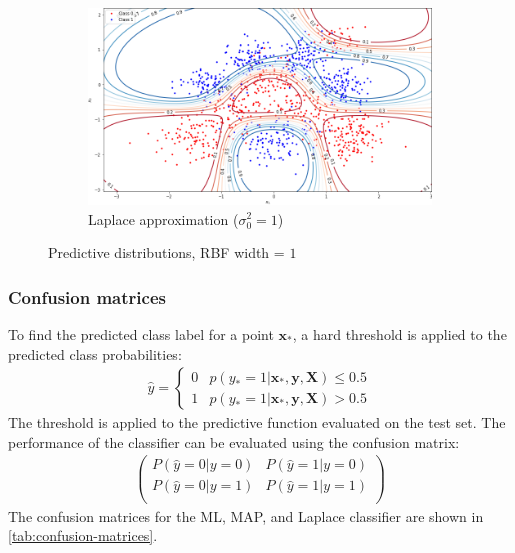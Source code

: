 \documentclass[a4paper]{article}
\begin{document}
\begin{figure}[h]
\begin{subfigure}{0.33\textwidth}
        \end{subfigure}
        \begin{subfigure}{0.33\textwidth}
            \centering
            \includegraphics[width=\textwidth]{plots/bayesian_logistic_classification/predictive_distribution_laplace_width_1_prior_variance_1}
            \caption{Laplace approximation ($\sigma_0^2=1$)}
            \label{fig:predictive-distribution-laplace-width-1}
        \end{subfigure}
        \caption{Predictive distributions, RBF width = $1$}
        \label{fig:predictive-distributions-width-1}
    \end{figure}

    \subsubsection{Confusion matrices}
    To find the predicted class label for a point $\bm{x}_*$, a hard threshold is applied to the predicted class probabilities:
    \begin{align*}
        \hat{y} = \begin{cases}
                        0 & p(y_* = 1 | \bm{x}_*, \bm{y}, \bm{X}) \leq 0.5 \\
                        1 & p(y_* = 1 | \bm{x}_*, \bm{y}, \bm{X}) > 0.5
                    \end{cases}
    \end{align*}
    The threshold is applied to the predictive function evaluated on the test set.
    The performance of the classifier can be evaluated using the confusion matrix:
    \begin{align*}
        \begin{pmatrix}
                 P(\hat{y}=0 | y=0) & P(\hat{y}=1 | y=0) \\
                 P(\hat{y}=0 | y=1) & P(\hat{y}=1 | y=1) \\
        \end{pmatrix}
    \end{align*}
    The confusion matrices for the ML, MAP, and Laplace classifier are shown in \autoref{tab:confusion-matrices}.
\end{document}
